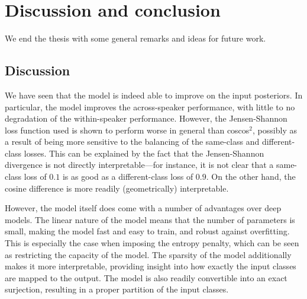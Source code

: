 %
%
%

\chapter{Discussion and conclusion}
\label{ch:discussion}

We end the thesis with some general remarks and ideas for future work.

\section{Discussion}
We have seen that the model is indeed able to improve on the input posteriors.
In particular, the model improves the across-speaker performance, with little to no degradation of the within-speaker performance.
However, the Jensen-Shannon loss function used is shown to perform worse in general than coscos$^2$, possibly as a result of being more sensitive to the balancing of the same-class and different-class losses.
This can be explained by the fact that the Jensen-Shannon divergence is not directly interpretable---for instance, it is not clear that a same-class loss of $0.1$ is as good as a different-class loss of $0.9$.
On the other hand, the cosine difference is more readily (geometrically) interpretable.

However, the model itself does come with a number of advantages over deep models.
The linear nature of the model means that the number of parameters is small, making the model fast and easy to train, and robust against overfitting.
This is especially the case when imposing the entropy penalty, which can be seen as restricting the capacity of the model.
The sparsity of the model additionally makes it more interpretable, providing insight into how exactly the input classes are mapped to the output.
The model is also readily convertible into an exact surjection, resulting in a proper partition of the input classes.

